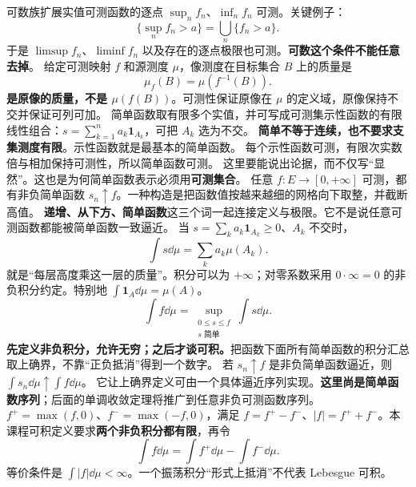 可数族扩展实值可测函数的逐点 $\sup_n f_n$、$\inf_n f_n$ 可测。关键例子：
\[
\{\sup_n f_n>a\}=\bigcup_n\{f_n>a\}.
\]
于是 $\limsup f_n$、$\liminf f_n$ 以及存在的逐点极限也可测。\textbf{可数这个条件不能任意去掉}。
给定可测映射 $f$ 和源测度 $\mu$，像测度在目标集合 $B$ 上的质量是
\[
\mu_f(B)=\mu(f^{-1}(B)).
\]
\textbf{是原像的质量，不是 $\mu(f(B))$}。可测性保证原像在 $\mu$ 的定义域，原像保持不交并保证可列可加。
简单函数取有限多个实值，并可写成可测集示性函数的有限线性组合：$s=\sum_{k=1}^n a_k\mathbf1_{A_k}$，可把 $A_k$ 选为不交。
\textbf{简单不等于连续，也不要求支集测度有限}。示性函数就是最基本的简单函数。
每个示性函数可测，有限次实数倍与相加保持可测性，所以简单函数可测。
这里要能说出论据，而不仅写“显然”。这也是为何简单函数表示必须用\textbf{可测集合}。
任意 $f:E\to[0,+\infty]$ 可测，都有非负简单函数 $s_n\uparrow f$。一种构造是把函数值按越来越细的网格向下取整，并截断高值。
\textbf{递增、从下方、简单函数}这三个词一起连接定义与极限。它不是说任意可测函数都能被简单函数一致逼近。
当 $s=\sum_k a_k\mathbf1_{A_k}\ge0$、$A_k$ 不交时，
\[
\int s\dd\mu=\sum_k a_k\mu(A_k).
\]
就是“每层高度乘这一层的质量”。积分可以为 $+\infty$；对零系数采用 $0\cdot\infty=0$ 的非负积分约定。特别地 $\int\mathbf1_A\dd\mu=\mu(A)$。
\[
\int f\dd\mu=\sup_{\substack{0\le s\le f\\s\text{ 简单}}}\int s\dd\mu.
\]
\textbf{先定义非负积分，允许无穷；之后才谈可积。}把函数下面所有简单函数的积分汇总取上确界，不靠“正负抵消”得到一个数字。
若 $s_n\uparrow f$ 是非负简单函数逼近，则 $\int s_n\dd\mu\uparrow\int f\dd\mu$。
它让上确界定义可由一个具体逼近序列实现。\textbf{这里尚是简单函数序列}；后面的单调收敛定理将推广到任意非负可测函数序列。
$f^+=\max(f,0)$、$f^-=\max(-f,0)$，满足 $f=f^+-f^-$、$|f|=f^++f^-$。本课程可积定义要求\textbf{两个非负积分都有限}，再令
\[
\int f\dd\mu=\int f^+\dd\mu-\int f^-\dd\mu.
\]
等价条件是 $\int|f|\dd\mu<\infty$。一个振荡积分“形式上抵消”不代表 Lebesgue 可积。
